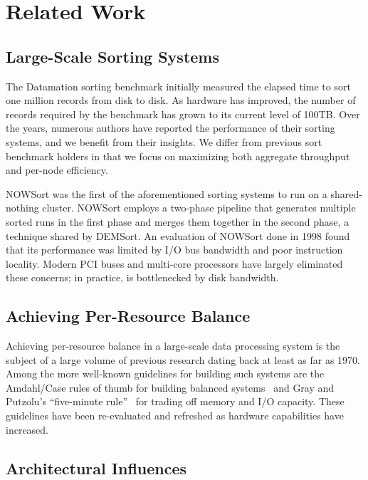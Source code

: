 \chapter{Related Work}
\label{chapter:related}

\section{Large-Scale Sorting Systems}

The Datamation sorting benchmark\cite{datamation} initially measured the
elapsed time to sort one million records from disk to disk. As hardware has
improved, the number of records required by the benchmark has grown to its
current level of 100TB.  Over the years, numerous authors have reported the
performance of their sorting systems, and we benefit from their
insights\cite{DEMSort, TokuSampleSort, SCS, nowsort, NSort, alphaSort}.  We
differ from previous sort benchmark holders in that we focus on maximizing both
aggregate throughput and per-node efficiency.

NOWSort\cite{nowsort} was the first of the aforementioned sorting systems to
run on a shared-nothing cluster.  NOWSort employs a two-phase pipeline that
generates multiple sorted runs in the first phase and merges them together in
the second phase, a technique shared by DEMSort\cite{DEMSort}.  An evaluation
of NOWSort done in 1998\cite{balance98} found that its performance was
limited by I/O bus bandwidth and poor instruction locality.  Modern PCI buses
and multi-core processors have largely eliminated these concerns; in practice,
\tritonsort is bottlenecked by disk bandwidth.


\section{Achieving Per-Resource Balance}

Achieving per-resource balance in a large-scale data processing system is the
subject of a large volume of previous research dating back at least as far as
1970.  Among the more well-known guidelines for building such systems are the
Amdahl/Case rules of thumb for building balanced systems~\cite{amdahlcase} and
Gray and Putzolu's ``five-minute rule''~\cite{fiveminuterule} for trading off
memory and I/O capacity.  These guidelines have been re-evaluated and refreshed
as hardware capabilities have increased.

\section{Architectural Influences}

